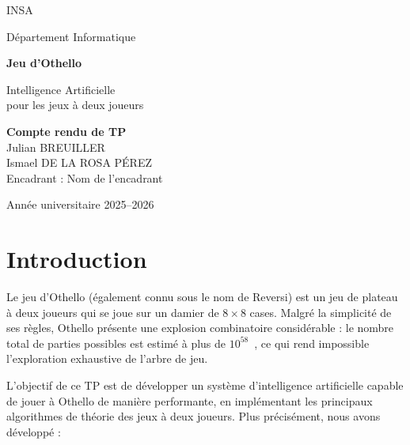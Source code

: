 \documentclass[12pt, a4paper]{article}
\begin{document}
\begin{titlepage}
    \centering
    \vspace*{2cm}

    {\Large \textsc{INSA} \par}
    \vspace{0.5cm}
    {\large Département Informatique \par}

    \vspace{3cm}

    {\Huge \textbf{Jeu d'Othello} \par}
    \vspace{0.5cm}
    {\LARGE Intelligence Artificielle \\ pour les jeux à deux joueurs \par}

    \vspace{2cm}

    {\large
    \textbf{Compte rendu de TP} \\[0.5cm]
    Julian BREUILLER \\
    Ismael DE LA ROSA PÉREZ \\[1cm]
    Encadrant : Nom de l'encadrant \\[0.5cm]
    }

    \vfill

    {\large Année universitaire 2025--2026 \par}
\end{titlepage}

\tableofcontents
\newpage

\section{Introduction}

Le jeu d'Othello (également connu sous le nom de Reversi) est un jeu de plateau à deux joueurs qui se joue sur un damier de $8 \times 8$ cases. Malgré la simplicité de ses règles, Othello présente une explosion combinatoire considérable : le nombre total de parties possibles est estimé à plus de $10^{58}$~\cite{buro1997}, ce qui rend impossible l'exploration exhaustive de l'arbre de jeu.

L'objectif de ce TP est de développer un système d'intelligence artificielle capable de jouer à Othello de manière performante, en implémentant les principaux algorithmes de théorie des jeux à deux joueurs. Plus précisément, nous avons développé :
\end{document}

